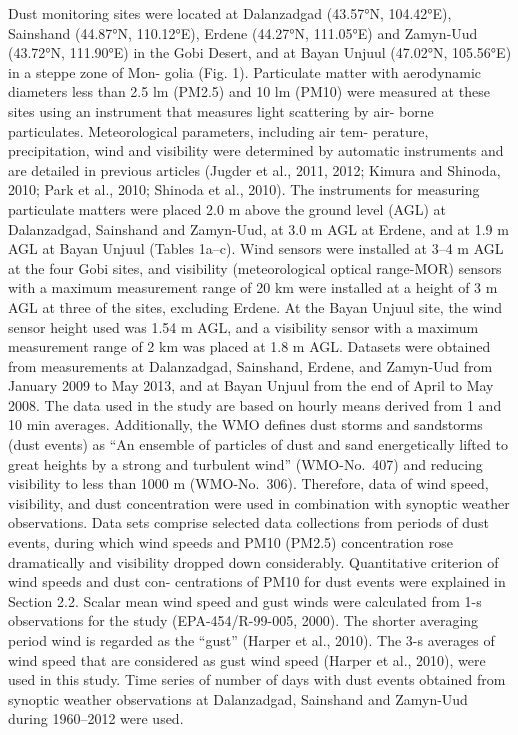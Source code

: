 \documentclass[
  letterpaper,
  DIV=11,
  numbers=noendperiod]{scrartcl}
\begin{document}
Dust monitoring sites were located at Dalanzadgad (43.57°N, 104.42°E),
Sainshand (44.87°N, 110.12°E), Erdene (44.27°N, 111.05°E) and Zamyn-Uud
(43.72°N, 111.90°E) in the Gobi Desert, and at Bayan Unjuul (47.02°N,
105.56°E) in a steppe zone of Mon- golia (Fig. 1). Particulate matter
with aerodynamic diameters less than 2.5 lm (PM2.5) and 10 lm (PM10)
were measured at these sites using an instrument that measures light
scattering by air- borne particulates. Meteorological parameters,
including air tem- perature, precipitation, wind and visibility were
determined by automatic instruments and are detailed in previous
articles (Jugder et al., 2011, 2012; Kimura and Shinoda, 2010; Park et
al., 2010; Shinoda et al., 2010). The instruments for measuring
particulate matters were placed 2.0 m above the ground level (AGL) at
Dalanzadgad, Sainshand and Zamyn-Uud, at 3.0 m AGL at Erdene, and at 1.9
m AGL at Bayan Unjuul (Tables 1a--c). Wind sensors were installed at
3--4 m AGL at the four Gobi sites, and visibility (meteorological
optical range-MOR) sensors with a maximum measurement range of 20 km
were installed at a height of 3 m AGL at three of the sites, excluding
Erdene. At the Bayan Unjuul site, the wind sensor height used was 1.54 m
AGL, and a visibility sensor with a maximum measurement range of 2 km
was placed at 1.8 m AGL. Datasets were obtained from measurements at
Dalanzadgad, Sainshand, Erdene, and Zamyn-Uud from January 2009 to May
2013, and at Bayan Unjuul from the end of April to May 2008. The data
used in the study are based on hourly means derived from 1 and 10 min
averages. Additionally, the WMO defines dust storms and sandstorms (dust
events) as ``An ensemble of particles of dust and sand energetically
lifted to great heights by a strong and turbulent wind'' (WMO-No.~407)
and reducing visibility to less than 1000 m (WMO-No.~306). Therefore,
data of wind speed, visibility, and dust concentration were used in
combination with synoptic weather observations. Data sets comprise
selected data collections from periods of dust events, during which wind
speeds and PM10 (PM2.5) concentration rose dramatically and visibility
dropped down considerably. Quantitative criterion of wind speeds and
dust con- centrations of PM10 for dust events were explained in Section
2.2. Scalar mean wind speed and gust winds were calculated from 1-s
observations for the study (EPA-454/R-99-005, 2000). The shorter
averaging period wind is regarded as the ``gust'' (Harper et al., 2010).
The 3-s averages of wind speed that are considered as gust wind speed
(Harper et al., 2010), were used in this study. Time series of number of
days with dust events obtained from synoptic weather observations at
Dalanzadgad, Sainshand and Zamyn-Uud during 1960--2012 were used.
\end{document}
